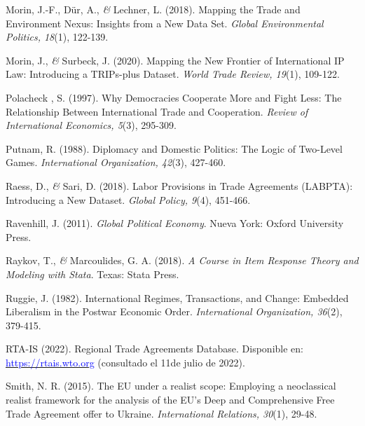 \documentclass[a4paper]{tufte-handout}
\begin{document}
\begin{list}{}
\item{\small Morin, J.-F., Dür, A., {\itshape \&} Lechner, L. (2018). Mapping the Trade and Environment Nexus: Insights from a New Data Set. {\itshape Global Environmental Politics, 18}(1), 122-139.}

\item{\small Morin, J., {\itshape \&} Surbeck, J. (2020). Mapping the New Frontier of International IP Law: Introducing a TRIPs-plus Dataset. {\itshape World Trade Review, 19}(1), 109-122.}

\item{\small Polacheck , S. (1997). Why Democracies Cooperate More and Fight Less: The Relationship Between International Trade and Cooperation. {\itshape Review of International Economics, 5}(3), 295-309.}

\item{\small Putnam, R. (1988). Diplomacy and Domestic Politics: The Logic of Two-Level Games. {\itshape International Organization, 42}(3), 427-460.}

\item{\small Raess, D., {\itshape \&} Sari, D. (2018). Labor Provisions in Trade Agreements (LABPTA): Introducing a New Dataset. {\itshape Global Policy, 9}(4), 451-466.}

\item{\small Ravenhill, J. (2011). {\itshape Global Political Economy}. Nueva York: Oxford University Press.}

\item{\small Raykov, T., {\itshape \&} Marcoulides, G. A. (2018). {\itshape A Course in Item Response Theory and Modeling with Stata}. Texas: Stata Press.}

\item{\small Ruggie, J. (1982). International Regimes, Transactions, and Change: Embedded Liberalism in the Postwar Economic Order. {\itshape International Organization, 36}(2), 379-415.}

\item{\small RTA-IS (2022). Regional Trade Agreements Database. Disponible en: \\ \href{https://rtais.wto.org/UI/PublicMaintainRTAHome.aspx}{\textcolor{blue}{https://rtais.wto.org}} (consultado el 11de julio de 2022).}

\item{\small Smith, N. R. (2015). The EU under a realist scope: Employing a neoclassical realist framework for the analysis of the EU’s Deep and Comprehensive Free Trade Agreement offer to Ukraine. {\itshape International Relations, 30}(1), 29-48.}


\end{list}
\end{document}
